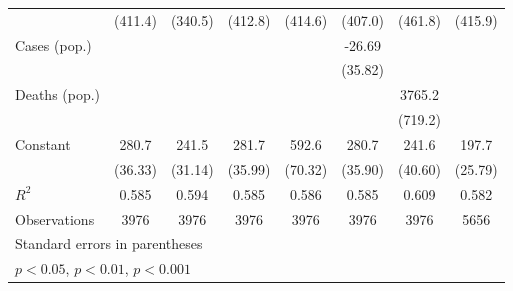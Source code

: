 \documentclass{article}
\begin{document}
{\begin{longtable}{l*{7}{c}}
                &  (411.4)         &  (340.5)         &  (412.8)         &  (414.6)         &  (407.0)         &  (461.8)         &  (415.9)         \\
Cases (pop.)    &                  &                  &                  &                  &   -26.69         &                  &                  \\
                &                  &                  &                  &                  &  (35.82)         &                  &                  \\
Deaths (pop.)   &                  &                  &                  &                  &                  &   3765.2\sym{***}&                  \\
                &                  &                  &                  &                  &                  &  (719.2)         &                  \\
Constant        &    280.7\sym{***}&    241.5\sym{***}&    281.7\sym{***}&    592.6\sym{***}&    280.7\sym{***}&    241.6\sym{***}&    197.7\sym{***}\\
                &  (36.33)         &  (31.14)         &  (35.99)         &  (70.32)         &  (35.90)         &  (40.60)         &  (25.79)         \\
\hline
\(R^{2}\)       &    0.585         &    0.594         &    0.585         &    0.586         &    0.585         &    0.609         &    0.582         \\
Observations    &     3976         &     3976         &     3976         &     3976         &     3976         &     3976         &     5656         \\
\hline\hline
\multicolumn{8}{l}{\footnotesize Standard errors in parentheses}\\
\multicolumn{8}{l}{\footnotesize \sym{*} \(p<0.05\), \sym{**} \(p<0.01\), \sym{***} \(p<0.001\)}\\
\end{longtable}
}
\end{document}
